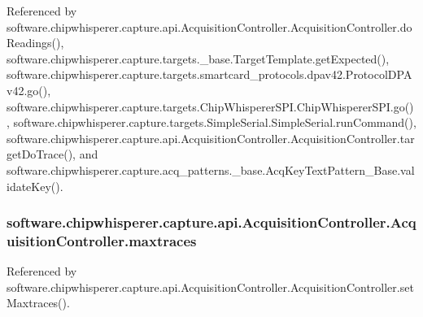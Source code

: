 Referenced by software.\+chipwhisperer.\+capture.\+api.\+Acquisition\+Controller.\+Acquisition\+Controller.\+do\+Readings(), software.\+chipwhisperer.\+capture.\+targets.\+\_\+base.\+Target\+Template.\+get\+Expected(), software.\+chipwhisperer.\+capture.\+targets.\+smartcard\+\_\+protocols.\+dpav42.\+Protocol\+D\+P\+Av42.\+go(), software.\+chipwhisperer.\+capture.\+targets.\+Chip\+Whisperer\+S\+P\+I.\+Chip\+Whisperer\+S\+P\+I.\+go(), software.\+chipwhisperer.\+capture.\+targets.\+Simple\+Serial.\+Simple\+Serial.\+run\+Command(), software.\+chipwhisperer.\+capture.\+api.\+Acquisition\+Controller.\+Acquisition\+Controller.\+target\+Do\+Trace(), and software.\+chipwhisperer.\+capture.\+acq\+\_\+patterns.\+\_\+base.\+Acq\+Key\+Text\+Pattern\+\_\+\+Base.\+validate\+Key().

\hypertarget{classsoftware_1_1chipwhisperer_1_1capture_1_1api_1_1AcquisitionController_1_1AcquisitionController_a1ccca7f63c75e7691751ada44d8b54ee}{}
\subsubsection[{maxtraces}]{\setlength{\rightskip}{0pt plus 5cm}software.\+chipwhisperer.\+capture.\+api.\+Acquisition\+Controller.\+Acquisition\+Controller.\+maxtraces}\label{classsoftware_1_1chipwhisperer_1_1capture_1_1api_1_1AcquisitionController_1_1AcquisitionController_a1ccca7f63c75e7691751ada44d8b54ee}


Referenced by software.\+chipwhisperer.\+capture.\+api.\+Acquisition\+Controller.\+Acquisition\+Controller.\+set\+Maxtraces().

\hypertarget{classsoftware_1_1chipwhisperer_1_1capture_1_1api_1_1AcquisitionController_1_1AcquisitionController_af1d86ccae9fa550130d0d8513a1e746f}{}
